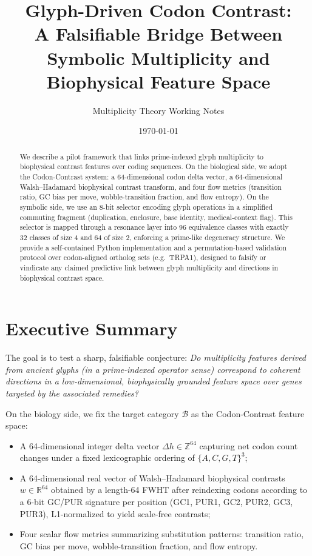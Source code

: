 \documentclass[11pt]{article}
\title{Glyph-Driven Codon Contrast:\\
A Falsifiable Bridge Between Symbolic Multiplicity and Biophysical Feature Space}
\author{Multiplicity Theory Working Notes}
\date{\today}
\begin{document}
\maketitle

\begin{abstract}
We describe a pilot framework that links prime-indexed glyph multiplicity to biophysical contrast features over coding sequences. On the biological side, we adopt the Codon-Contrast system: a 64-dimensional codon delta vector, a 64-dimensional Walsh--Hadamard biophysical contrast transform, and four flow metrics (transition ratio, GC bias per move, wobble-transition fraction, and flow entropy).\cite{codoncontrast} On the symbolic side, we use an 8-bit selector encoding glyph operations in a simplified commuting fragment (duplication, enclosure, base identity, medical-context flag). This selector is mapped through a resonance layer into 96 equivalence classes with exactly 32 classes of size 4 and 64 of size 2, enforcing a prime-like degeneracy structure. We provide a self-contained Python implementation and a permutation-based validation protocol over codon-aligned ortholog sets (e.g.\ TRPA1), designed to falsify or vindicate any claimed predictive link between glyph multiplicity and directions in biophysical contrast space.\cite{glyphengine}
\end{abstract}

\section{Executive Summary}

The goal is to test a sharp, falsifiable conjecture:
\emph{Do multiplicity features derived from ancient glyphs (in a prime-indexed operator sense) correspond to coherent directions in a low-dimensional, biophysically grounded feature space over genes targeted by the associated remedies?}\cite{glyphengine}

On the biology side, we fix the target category $\mathcal{B}$ as the Codon-Contrast feature space:
\begin{itemize}
  \item A 64-dimensional integer delta vector $\Delta h \in \mathbb{Z}^{64}$ capturing net codon count changes under a fixed lexicographic ordering of $\{A,C,G,T\}^3$;
  \item A 64-dimensional real vector of Walsh--Hadamard biophysical contrasts $w \in \mathbb{R}^{64}$ obtained by a length-64 FWHT after reindexing codons according to a 6-bit GC/PUR signature per position (GC1, PUR1, GC2, PUR2, GC3, PUR3), L1-normalized to yield scale-free contrasts;\cite{codoncontrast}
  \item Four scalar flow metrics summarizing substitution patterns: transition ratio, GC bias per move, wobble-transition fraction, and flow entropy.\cite{codoncontrast}
\end{itemize}
\end{document}
